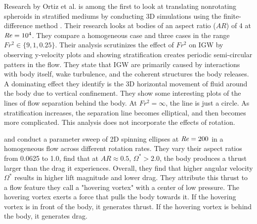 Research by Ortiz et al. \cite{ortiz-tarin_stratified_2019} is among the first to look at translating nonrotating spheroids in stratified mediums by conducting 3D simulations using the finite-difference method . Their research looks at bodies of an aspect ratio ($AR$) of 4 at $\mathit{Re} = 10^4$. They compare a homogeneous case and three cases in the range $Fr^2 \in \{9, 1, 0.25\}$. Their analysis scrutinizes the effect of $Fr^2$ on IGW by observing y-velocity plots and showing stratification creates periodic semi-circular patters in the flow. They state that IGW are primarily caused by interactions with body itself, wake turbulence, and the coherent structures the body releases. A dominating effect they identify is the 3D horizontal movement of fluid around the body due to vertical confinement. They show some interesting plots of the lines of flow separation behind the body. At $Fr^2 = \infty$, the line is just a circle. As stratification increases, the separation line becomes elliptical, and then becomes more complicated. This analysis does not incorporate the effects of rotation.

\cite{lu_flow_2018} and \cite{lua_rotating_2018} conduct a parameter sweep of 2D spinning ellipses at $\mathit{Re} = 200$ in a homogeneous flow across different rotation rates. They vary their aspect ratios from 0.0625 to 1.0, find that at $AR \approx 0.5$, $\Omega^{\ast} > 2.0$, the body produces a thrust larger than the drag it experiences. Overall, they find that higher angular velocity $\Omega^{\ast}$ results in higher lift magnitude and lower drag. They attribute this thrust to a flow feature they call a "hovering vortex" with a center of low pressure. The hovering vortex exerts a force that pulls the body towards it. If the hovering vortex is in front of the body, it generates thrust. If the hovering vortex is behind the body, it generates drag.  

